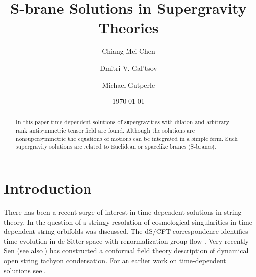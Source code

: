 \documentclass[a4paper,aps,nofootinbib,showpacs,preprint]{revtex4}
\begin{document}
 

\title{S-brane Solutions in Supergravity Theories}

\author{Chiang-Mei Chen}

\author{Dmitri V. Gal'tsov}

\author{Michael Gutperle}

\date{\today}

\begin{abstract}
In this paper time dependent solutions of supergravities with
dilaton and arbitrary rank antisymmetric tensor field are found.
Although the solutions are nonsupersymmetric the equations of
motions can be integrated in a simple form. Such supergravity
solutions are related to Euclidean or spacelike branes (S-branes).
\end{abstract}


\maketitle

\section{Introduction}
There has been a recent surge of interest in time dependent
solutions in string theory. In \cite{KOSST01,BHKN02,Ne02,CC02}
the question of a stringy resolution of cosmological
singularities in time dependent string orbifolds was discussed.
The dS/CFT correspondence \cite{St01,BBM01} identifies time
evolution in de Sitter space with renormalization group flow
\cite{St01a}. Very recently Sen \cite{Se02a,Se02b} (see also
\cite{Gib02}) has constructed a conformal field theory
description of dynamical open string tachyon condensation. For an
earlier work on time-dependent solutions see \cite{BF94,LOW97a,
LOW97b,PS97,LW97,IM01}.
\end{document}
